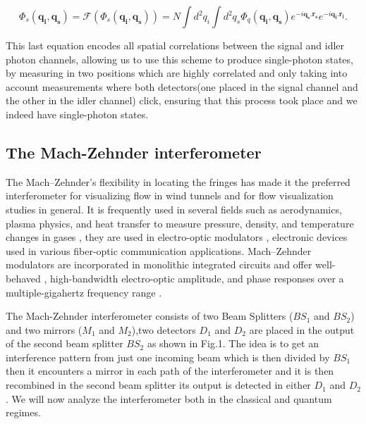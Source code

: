 \documentclass[12pt]{book}
\begin{document}
\begin{equation}
\Phi_{s}(\mathbf{q_{i}},\mathbf{q_{s}})=\mathscr{F}(\Phi_{s}(\mathbf{q_{i}},\mathbf{q_{s}}))=N \int d^{2}q_{i} \int d^{2}q_{s} \Phi_{q}(\mathbf{q_{i}},\mathbf{q_{s}}) e^{-i \mathbf{q_{s}}.\mathbf{r_{s}}} e^{-i \mathbf{q_{i}}.\mathbf{r_{i}}}.
\end{equation}

This last equation encodes all spatial correlations between the signal and idler photon channels, allowing us to use this scheme to produce single-photon states, by measuring in two positions which are highly correlated and only taking into account measurements where both detectors(one placed in the signal channel and the other in the idler channel) click, ensuring that this process took place and we indeed have single-photon states.

\subsection{The Mach-Zehnder interferometer }


 The Mach–Zehnder's flexibility in locating the fringes has made it the preferred interferometer for visualizing flow in wind tunnels \cite{10} and for flow visualization studies in general. It is frequently used in several fields such as aerodynamics, plasma physics, and heat transfer to measure pressure, density, and temperature changes in gases \cite{11}, they are used in electro-optic modulators \cite{ackerman}, electronic devices used in various fiber-optic communication applications. Mach–Zehnder modulators are incorporated in monolithic integrated circuits and offer well-behaved \cite{studenkov}, high-bandwidth electro-optic amplitude, and phase responses over a multiple-gigahertz frequency range \cite{capmany}.

The Mach-Zehnder interferometer consists of two Beam Splitters ($BS_{1}$ and $BS_{2}$) and two mirrors ($M_{1}$ and $M_{2}$),two detectors $D_{1}$ and $D_{2}$ are placed in the output of the second beam splitter $BS_{2}$ as shown in Fig.1. The idea is to get an interference pattern from just one incoming beam which is then divided by $BS_{1}$ then it encounters a mirror in each path of the interferometer and it is then recombined in the second beam splitter its output is detected in either $D_{1}$ and $D_{2}$. We will now analyze the interferometer both in the classical and quantum regimes.
\end{document}
